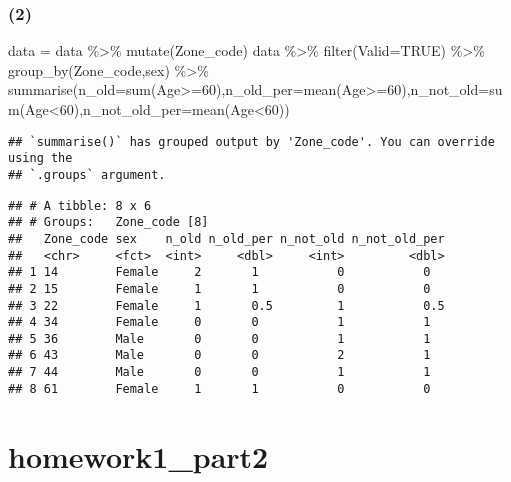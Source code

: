 \documentclass[
]{article}
\newenvironment{Shaded}{\begin{snugshade}}{\end{snugshade}}
\newcommand{\AttributeTok}[1]{\textcolor[rgb]{0.77,0.63,0.00}{#1}}
\newcommand{\ConstantTok}[1]{\textcolor[rgb]{0.00,0.00,0.00}{#1}}
\newcommand{\DecValTok}[1]{\textcolor[rgb]{0.00,0.00,0.81}{#1}}
\newcommand{\FunctionTok}[1]{\textcolor[rgb]{0.00,0.00,0.00}{#1}}
\newcommand{\NormalTok}[1]{#1}
\newcommand{\OtherTok}[1]{\textcolor[rgb]{0.56,0.35,0.01}{#1}}
\newcommand{\SpecialCharTok}[1]{\textcolor[rgb]{0.00,0.00,0.00}{#1}}
\begin{document}
\hypertarget{section-16}{%
\subsubsection{(2)}\label{section-16}}

\begin{Shaded}
\begin{Highlighting}[]
\NormalTok{data }\OtherTok{=}\NormalTok{ data }\SpecialCharTok{\%\textgreater{}\%} \FunctionTok{mutate}\NormalTok{(Zone\_code)}
\NormalTok{data }\SpecialCharTok{\%\textgreater{}\%} \FunctionTok{filter}\NormalTok{(}\AttributeTok{Valid=}\ConstantTok{TRUE}\NormalTok{) }\SpecialCharTok{\%\textgreater{}\%} \FunctionTok{group\_by}\NormalTok{(Zone\_code,sex) }\SpecialCharTok{\%\textgreater{}\%} \FunctionTok{summarise}\NormalTok{(}\AttributeTok{n\_old=}\FunctionTok{sum}\NormalTok{(Age}\SpecialCharTok{\textgreater{}=}\DecValTok{60}\NormalTok{),}\AttributeTok{n\_old\_per=}\FunctionTok{mean}\NormalTok{(Age}\SpecialCharTok{\textgreater{}=}\DecValTok{60}\NormalTok{),}\AttributeTok{n\_not\_old=}\FunctionTok{sum}\NormalTok{(Age}\SpecialCharTok{\textless{}}\DecValTok{60}\NormalTok{),}\AttributeTok{n\_not\_old\_per=}\FunctionTok{mean}\NormalTok{(Age}\SpecialCharTok{\textless{}}\DecValTok{60}\NormalTok{))}
\end{Highlighting}
\end{Shaded}

\begin{verbatim}
## `summarise()` has grouped output by 'Zone_code'. You can override using the
## `.groups` argument.
\end{verbatim}

\begin{verbatim}
## # A tibble: 8 x 6
## # Groups:   Zone_code [8]
##   Zone_code sex    n_old n_old_per n_not_old n_not_old_per
##   <chr>     <fct>  <int>     <dbl>     <int>         <dbl>
## 1 14        Female     2       1           0           0  
## 2 15        Female     1       1           0           0  
## 3 22        Female     1       0.5         1           0.5
## 4 34        Female     0       0           1           1  
## 5 36        Male       0       0           1           1  
## 6 43        Male       0       0           2           1  
## 7 44        Male       0       0           1           1  
## 8 61        Female     1       1           0           0
\end{verbatim}

\hypertarget{homework1_part2}{%
\section{homework1\_part2}\label{homework1_part2}}
\end{document}
